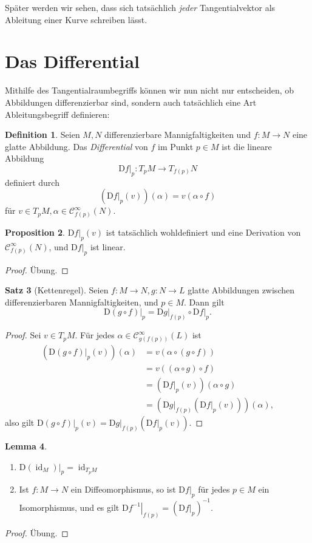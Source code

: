 \documentclass[a4paper]{scrreprt}
\numberwithin{equation}{chapter}
\newcommand{\DD}{\mathrm{D}}
\DeclareMathOperator{\id}{id}
\newcommand{\sC}{\mathcal{C}^{\infty}}
\theoremstyle{definition}
\newtheorem{defn}{Definition}[section]
\newtheorem{lemma}[defn]{Lemma}
\newtheorem{prop}[defn]{Proposition}
\newtheorem{satz}[defn]{Satz}
\newcommand{\bewUeb}{\begin{proof}Übung.\end{proof}}
\begin{document}
Später werden wir sehen, dass sich tatsächlich \emph{jeder} Tangentialvektor als Ableitung einer Kurve schreiben lässt.

\section{Das Differential}

Mithilfe des Tangentialraumbegriffs können wir nun nicht nur entscheiden, ob Abbildungen differenzierbar sind, sondern auch tatsächlich eine Art Ableitungsbegriff definieren:
\begin{defn}
	Seien $M,N$ differenzierbare Mannigfaltigkeiten und $f\colon M \to N$ eine glatte Abbildung. Das \emph{Differential} von $f$ im Punkt $p\in M$ ist die lineare Abbildung
	\[\left.\DD f\right|_p \colon T_pM \to T_{f(p)}N\]
	definiert durch
	\[\left(\left.\DD f\right|_p(v)\right)(\alpha) = v (\alpha\circ f)\]
	für $v\in T_pM, \alpha \in \sC_{f(p)}(N)$.
\end{defn}
\begin{prop}
	$\left.\DD f\right|_p(v)$ ist tatsächlich wohldefiniert und eine Derivation von $\sC_{f(p)}(N)$, und $\left.\DD f\right|_p$ ist linear. \bewUeb
\end{prop}

\begin{satz}[Kettenregel]
	Seien $f\colon M \to N, g\colon N \to L$ glatte Abbildungen zwischen differenzierbaren Mannigfaltigkeiten, und $p \in M$. Dann gilt \[\left.\DD(g\circ f)\right|_p = \left.\DD g\right|_{f(p)} \circ \left.\DD f\right|_p.\]

	\begin{proof}
		Sei $v \in T_pM$. Für jedes $\alpha \in \sC_{g(f(p))}(L)$ ist
		\begin{align*}
			\left(\left.\DD(g\circ f)\right|_p(v)\right)(\alpha) &= v(\alpha\circ (g \circ f))\\
			&= v((\alpha\circ g) \circ f)\\
			&= \left(\left.\DD f\right|_p(v)\right) (\alpha \circ g)\\
			&= \left(\left.\DD g\right|_{f(p)} \left(\left.\DD f\right|_p(v)\right)\right) (\alpha),
		\end{align*}
		also gilt $\left.\DD(g\circ f)\right|_p(v) = \left.\DD g\right|_{f(p)}\left(\left.\DD f\right|_p(v)\right)$.
	\end{proof}
\end{satz}

\begin{lemma} \label{lemma:differential_diffeo}
	\begin{enumerate}[label=(\alph*)]
		\item $\left.\DD(\id_M)\right|_p = \id_{T_pM}$
		\item Ist $f\colon M \to N$ ein Diffeomorphismus, so ist $\left.\DD f\right|_p$ für jedes $p\in M$ ein Isomorphismus, und es gilt $\left.\DD f^{-1}\right|_{f(p)} = \left(\left.\DD f\right|_p\right)^{-1}$.
	\end{enumerate}
	\bewUeb
\end{lemma}
\end{document}
